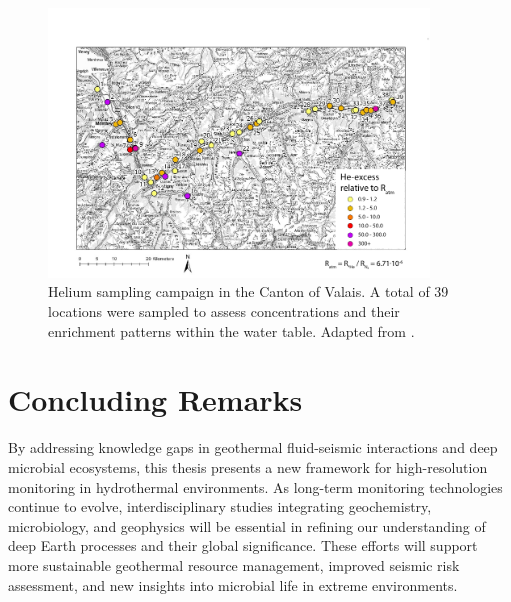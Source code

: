 \FloatBarrier  

\begin{figure}[t]  %
\begin{center}
\includegraphics[width=0.9\textwidth]{chapters/05_conclusion_outlook/valais.pdf}
\end{center}
\caption{Helium sampling campaign in the Canton of Valais.
A total of 39 locations were sampled to assess  concentrations and their enrichment patterns within the water table.
Adapted from \cite{marion2023valais}.}
\label{fig:concl_valais}
\end{figure}

\FloatBarrier  %

\section*{Concluding Remarks}
By addressing knowledge gaps in geothermal fluid-seismic interactions and deep microbial ecosystems, this thesis presents a new framework for high-resolution monitoring in hydrothermal environments.
As long-term monitoring technologies continue to evolve, interdisciplinary studies integrating geochemistry, microbiology, and geophysics will be essential in refining our understanding of deep Earth processes and their global significance.
These efforts will support more sustainable geothermal resource management, improved seismic risk assessment, and new insights into microbial life in extreme environments.